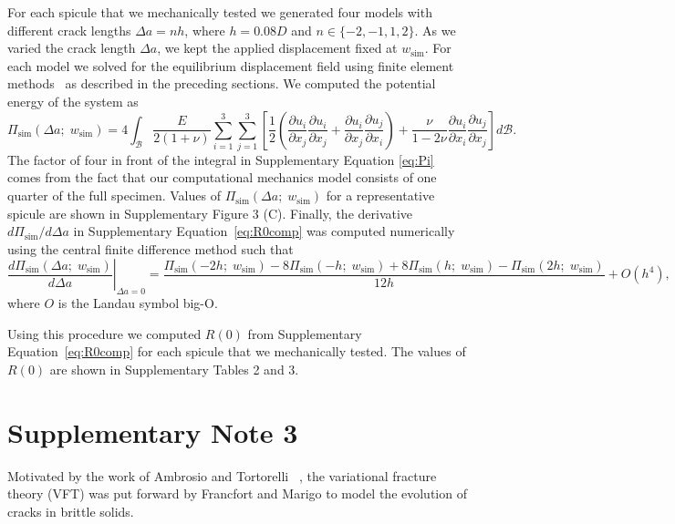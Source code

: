 \documentclass[12pt,onecolumn]{article}
\begin{document}
\begin{bibunit}
For each spicule that we mechanically tested we generated four models with different crack lengths $\Delta a= n h$, where $h=0.08D$ and $n \in \{-2,-1,1,2\}$. As we varied the crack length $\Delta a$, we kept the applied displacement fixed at $w_\mathrm{sim}$. For each model we solved for the equilibrium displacement field using finite element methods~\cite{hughes2012finite} as described in the preceding sections. We computed the potential energy of the system as
%
\begin{equation}
    \label{eq:Pi}
    \Pi_\mathrm{sim}(\Delta a;\;w_\mathrm{sim})=4\int_{\mathcal{B}}\frac{E}{2(1+\nu)}\sum_{i=1}^{3}\sum_{j=1}^{3}\left[\frac{1}{2}\left(\frac{\partial u_i}{\partial x_j}\frac{\partial u_i}{\partial x_j}+\frac{\partial u_i}{\partial x_j}\frac{\partial u_j}{\partial x_i}\right)+\frac{\nu}{1-2\nu}\frac{\partial u_i}{\partial x_i}\frac{\partial u_j}{\partial x_j} \right]d\mathcal{B}.
\end{equation}
%
The factor of four in front of the integral in Supplementary Equation \eqref{eq:Pi} comes from the fact that our computational mechanics model consists of one quarter of the full specimen. Values of $\Pi_\mathrm{sim}(\Delta a;\;w_\mathrm{sim})$ for a representative spicule are shown in Supplementary Figure 3 (C). Finally, the derivative $d\Pi_\mathrm{sim}/d \Delta a$ in Supplementary Equation~\eqref{eq:R0comp} was computed numerically using the central finite difference method such that
%
\begin{equation}
\label{eq:deriv1}
\left.\frac{d\Pi_\mathrm{sim}(\Delta a;\;w_\mathrm{sim})}{d \Delta a}\right\vert_{\Delta a=0}= \frac{\Pi_\mathrm{sim}(-2h;\;w_\mathrm{sim})-8\Pi_\mathrm{sim}(-h;\;w_\mathrm{sim})+8\Pi_\mathrm{sim}(h;\;w_\mathrm{sim})-\Pi_\mathrm{sim}(2h;\;w_\mathrm{sim})}{12h}+ O(h^4),
\end{equation}
%
where $O$ is the Landau symbol big-O.

Using this procedure we computed $R(0)$ from Supplementary Equation~\eqref{eq:R0comp} for each spicule that we mechanically tested. The values of $R(0)$ are shown in Supplementary Tables 2 and 3.

\section*{Supplementary Note 3}
\label{sec:VFmethod}
Motivated by the work of Ambrosio and Tortorelli ~\cite{ambrosio_1990a,ambrosio_1990b},  the variational fracture theory (VFT) was put forward by Francfort and Marigo \cite{francfort_1998} to model the evolution of cracks in brittle solids.


\end{bibunit}
\end{document}
